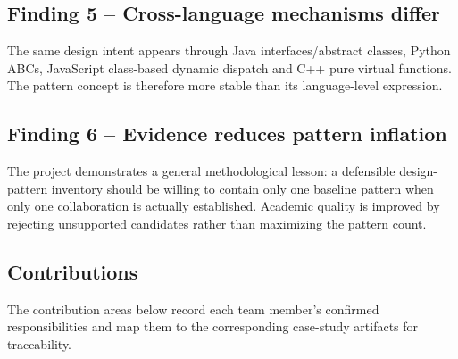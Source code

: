 \documentclass[10pt,a4paper]{article}
\begin{document}
\subsection{Finding 5 -- Cross-language mechanisms differ}

The same design intent appears through Java interfaces/abstract classes, Python ABCs, JavaScript class-based dynamic dispatch and C++ pure virtual functions. The pattern concept is therefore more stable than its language-level expression.

\subsection{Finding 6 -- Evidence reduces pattern inflation}

The project demonstrates a general methodological lesson: a defensible design-pattern inventory should be willing to contain only one baseline pattern when only one collaboration is actually established. Academic quality is improved by rejecting unsupported candidates rather than maximizing the pattern count.

\subsection{Contributions}

The contribution areas below record each team member’s confirmed responsibilities and map them to the corresponding case-study artifacts for traceability.
\end{document}
